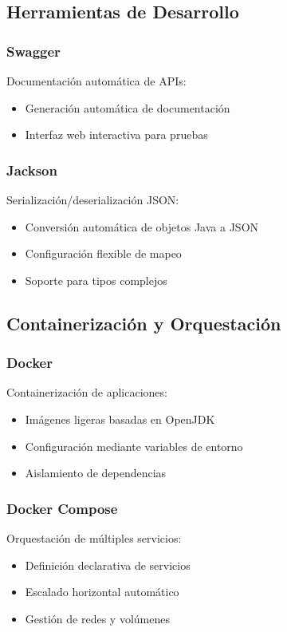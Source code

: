 \subsection*{Herramientas de Desarrollo}


\subsubsection*{Swagger}
Documentación automática de APIs:
\begin{itemize}
    \item Generación automática de documentación
    \item Interfaz web interactiva para pruebas
\end{itemize}

\subsubsection*{Jackson}
Serialización/deserialización JSON:
\begin{itemize}
    \item Conversión automática de objetos Java a JSON
    \item Configuración flexible de mapeo
    \item Soporte para tipos complejos
\end{itemize}

\subsection*{Containerización y Orquestación}

\subsubsection*{Docker}
Containerización de aplicaciones:
\begin{itemize}
    \item Imágenes ligeras basadas en OpenJDK
    \item Configuración mediante variables de entorno
    \item Aislamiento de dependencias
\end{itemize}

\subsubsection*{Docker Compose}
Orquestación de múltiples servicios:
\begin{itemize}
    \item Definición declarativa de servicios
    \item Escalado horizontal automático
    \item Gestión de redes y volúmenes
\end{itemize}
